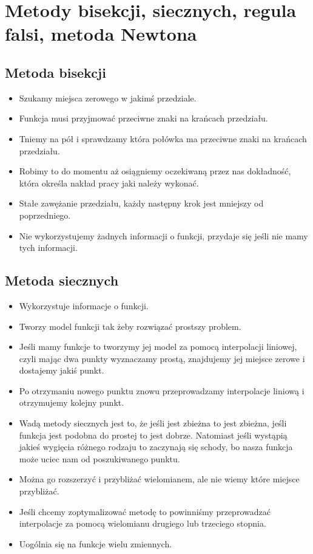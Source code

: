 \documentclass[a4paper]{article}
\begin{document}
\section{Metody bisekcji, siecznych, regula falsi, metoda Newtona}

\subsection{Metoda bisekcji}
\begin{itemize}
    \item Szukamy miejsca zerowego w jakimś przedziale.
    \item Funkcja musi przyjmować przeciwne znaki na krańcach przedziału.
    \item Tniemy na pół i sprawdzamy która połówka ma przeciwne znaki na krańcach przedziału.
    \item Robimy to do momentu aż osiągniemy oczekiwaną przez nas dokładność, która określa nakład pracy jaki należy wykonać.
    \item Stałe zawężanie przedziału, każdy następny krok jest mniejszy od poprzedniego.
    \item Nie wykorzystujemy żadnych informacji o funkcji, przydaje się jeśli nie mamy tych informacji.
\end{itemize}

\subsection{Metoda siecznych}
\begin{itemize}
    \item Wykorzystuje informacje o funkcji.
    \item Tworzy model funkcji tak żeby rozwiązać prostszy problem.
    \item Jeśli mamy funkcje to tworzymy jej model za pomocą interpolacji liniowej, czyli mając dwa punkty wyznaczamy prostą, znajdujemy jej miejsce zerowe i dostajemy jakiś punkt.
    \item Po otrzymaniu nowego punktu znowu przeprowadzamy interpolacje liniową i otrzymujemy kolejny punkt.
    \item Wadą metody siecznych jest to, że jeśli jest zbieżna to jest zbieżna, jeśli funkcja jest podobna do prostej to jest dobrze. Natomiast jeśli wystąpią jakieś wygięcia różnego rodzaju to zaczynają się schody, bo nasza funkcja może uciec nam od poszukiwanego punktu.
    \item Można go rozszerzyć i przybliżać wielomianem, ale nie wiemy które miejsce przybliżać.
    \item Jeśli chcemy zoptymalizować metodę to powinniśmy przeprowadzać interpolacje za pomocą wielomianu drugiego lub trzeciego stopnia.
    \item Uogólnia się na funkcje wielu zmiennych.
\end{itemize}
\end{document}
